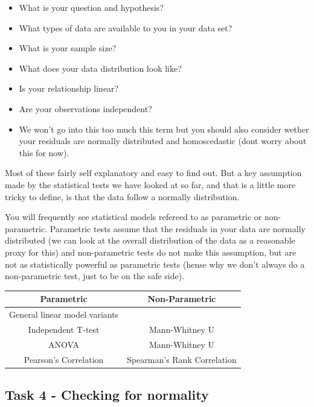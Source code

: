 \documentclass[
]{book}
\providecommand{\tightlist}{%
  \setlength{\itemsep}{0pt}\setlength{\parskip}{0pt}}
\begin{document}
\begin{itemize}
\tightlist
\item
  What is your question and hypothesis?
\item
  What types of data are available to you in your data set?
\item
  What is your sample size?
\item
  What does your data distribution look like?
\item
  Is your relationship linear?
\item
  Are your observations independent?
\item
  We won't go into this too much this term but you should also consider wether your residuals are normally distributed and homoscedastic (dont worry about this for now).
\end{itemize}

Most of these fairly self explanatory and easy to find out. But a key assumption made by the statistical tests we have looked at so far, and that is a little more tricky to define, is that the data follow a normally distribution.

You will frequently see statistical models refereed to as parametric or non-parametric. Parametric tests assume that the residuals in your data are normally distributed (we can look at the overall distribution of the data as a reasonable proxy for this) and non-parametric tests do not make this assumption, but are not as statistically powerful as parametric tests (hense why we don't always do a non-parametric test, just to be on the safe side).

\begin{longtable}[]{@{}cc@{}}
\toprule\noalign{}
Parametric & Non-Parametric \\
\midrule\noalign{}
\endhead
\bottomrule\noalign{}
\endlastfoot
General linear model variants & \\
Independent T-test & Mann-Whitney U \\
ANOVA & Mann-Whitney U \\
Pearson's Correlation & Spearman's Rank Correlation \\
\end{longtable}

\hypertarget{task-4---checking-for-normality}{%
\subsection{Task 4 - Checking for normality}\label{task-4---checking-for-normality}}
\end{document}
